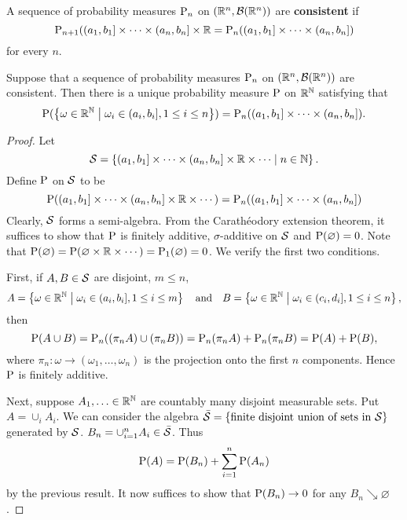 \begin{definition}
    A sequence of probability measures $\P_n$ on $(\R^n, \B(\R^n))$ 
    are  \textbf{consistent} if 
    \begin{equation*}
        \P_{n+1}((a_1, b_1]\times\cdots\times(a_n, b_n]\times\R 
        = \P_n((a_1, b_1]\times\cdots\times(a_n, b_n])
    \end{equation*}
    for every $n$. 
\end{definition}

\begin{theorem}
    Suppose that a sequence of probability measures $\P_n$ on $(\R^n, \B(\R^n))$ 
    are consistent. Then there is a unique probability measure $\P$ on $\R^\N$ 
    satisfying that 
    \begin{equation*}
        \P(\Set{\omega\in\R^\N}{\omega_i\in(a_i, b_i], 1\leq i\leq n}) = \P_n((a_1, b_1]\times\cdots\times(a_n, b_n]). 
    \end{equation*}
\end{theorem}
\begin{proof}
    Let 
    \begin{equation*}
        \S = \Set{(a_1, b_1]\times\cdots\times(a_n, b_n]\times\R\times\cdots}{n\in\N}. 
    \end{equation*}
    Define $\P$ on $\S$ to be 
    \begin{equation*}
        \P((a_1, b_1]\times\cdots\times(a_n, b_n]\times\R\times\cdots) = \P_n((a_1, b_1]\times\cdots\times(a_n, b_n])
    \end{equation*}
    Clearly, $\S$ forms a semi-algebra. From the Carath\'eodory 
    extension theorem, it suffices to show that $\P$ is finitely 
    additive, $\sigma$-additive on $\S$ and $\P(\varnothing) = 0$. 
    Note that $\P(\varnothing) = \P(\varnothing\times\R\times\cdots) 
    = \P_1(\varnothing) = 0$. We verify the first two conditions. 

    First, if $A,B\in\S$ are disjoint, $m\leq n$,   
    \begin{equation*}
        A = \Set{\omega\in\R^\N}{\omega_i\in (a_i, b_i], 1\leq i\leq m}\quad\text{and}\quad 
        B = \Set{\omega\in\R^\N}{\omega_i\in (c_i, d_i], 1\leq i\leq n}, 
    \end{equation*}
    then 
    \begin{equation*}
        \P(A\cup B) = \P_n((\pi_n A)\cup(\pi_n B)) = \P_n(\pi_n A) + \P_n(\pi_n B) 
        = \P(A) + \P(B), 
    \end{equation*}
    where $\pi_n:\omega\to(\omega_1,\ldots,\omega_n)$ is the projection onto 
    the first $n$ components. Hence $\P$ is finitely additive. 

    Next, suppose $A_1,\ldots\in \R^\N$ are countably many disjoint measurable sets. 
    Put $A = \cup_i A_i$. We can consider the algebra $\bar{\S} 
    = \set{\text{finite disjoint union of sets in $\S$}}$ generated by $\S$. 
    $B_n = \cup_{i=1}^n A_i\in\bar{\S}$. Thus 
    \begin{equation*}
        \P(A) = \P(B_n) + \sum_{i=1}^n\P(A_n) 
    \end{equation*} 
    by the previous result. It now suffices to show that 
    $\P(B_n)\to 0$ for any $B_n\searrow \varnothing$. 
\end{proof}